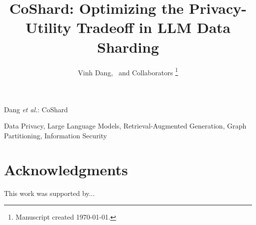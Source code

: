 \documentclass[lettersize,journal]{IEEEtran}
\begin{document}
\title{CoShard: Optimizing the Privacy-Utility Tradeoff in LLM Data Sharding}

\author{Vinh Dang,~
        and Collaborators
\thanks{Manuscript created \today.}}

%
{Dang \MakeLowercase{\textit{et al.}}: CoShard}

\maketitle

\begin{abstract}

\end{abstract}

\begin{IEEEkeywords}
Data Privacy, Large Language Models, Retrieval-Augmented Generation, Graph Partitioning, Information Security
\end{IEEEkeywords}









\section*{Acknowledgments}
This work was supported by...



\end{document}
